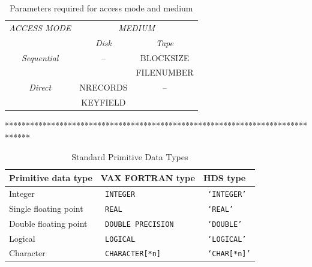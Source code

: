 \documentclass[twoside,11pt]{article}
\renewcommand{\_}{\texttt{\symbol{95}}}
\begin{document}
\begin{table}[h]
  \begin{center}
    \begin{tabular}{||c|c|c||} \hline
      \emph{ACCESS MODE} & \multicolumn{2}{c||}{\emph{MEDIUM}} \\ \cline{2-3}
& \emph{Disk} & \emph{Tape} \\ \hline
      \emph{Sequential} & -- & BLOCKSIZE \\
& & FILENUMBER \\ \hline
      \emph{Direct} & NRECORDS & -- \\
& KEYFIELD & \\ \hline
    \end{tabular}
    \caption {Parameters required for access mode and medium}
  \end{center}
\end {table}

******************************************************************************

\begin {table}[h]
  \begin {center}
    \begin {tabular}{||l|l|l||}
      \hline
      Primitive data type	& VAX FORTRAN type		& HDS type \\
      \hline
      Integer			& \texttt{ INTEGER}			& \texttt{ `\_INTEGER'} \\
      Single floating point	& \texttt{ REAL}			& \texttt{ `\_REAL'} \\
      Double floating point	& \texttt{ DOUBLE PRECISION}	& \texttt{ `\_DOUBLE'} \\
      Logical			& \texttt{ LOGICAL}			& \texttt{ `\_LOGICAL'} \\
      Character		& \texttt{ CHARACTER[*n]}		& \texttt{ `\_CHAR[*n]'} \\
      \hline
    \end {tabular}
    \caption {Standard Primitive Data Types}
  \end {center}
\end {table}

\newpage
\end{document}
